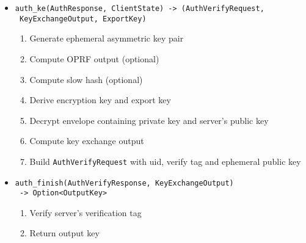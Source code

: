 \documentclass[../report.tex]{subfiles}
\begin{document}
\begin{itemize}
 \item \verb|auth_ke(AuthResponse, ClientState) -> (AuthVerifyRequest,|\\
       \verb| KeyExchangeOutput, ExportKey)|
  \begin{enumerate}
    \item Generate ephemeral asymmetric key pair
    \item Compute OPRF output (optional)
    \item Compute slow hash (optional)
    \item Derive encryption key and export key
    \item Decrypt envelope containing private key and server's public key
    \item Compute key exchange output
    \item Build \verb|AuthVerifyRequest| with uid, verify tag and ephemeral public key
  \end{enumerate}
 
 \item \verb|auth_finish(AuthVerifyResponse, KeyExchangeOutput)|\\
       \verb| -> Option<OutputKey>|
  \begin{enumerate}
    \item Verify server's verification tag
    \item Return output key
  \end{enumerate}
  
\end{itemize}
\end{document}
